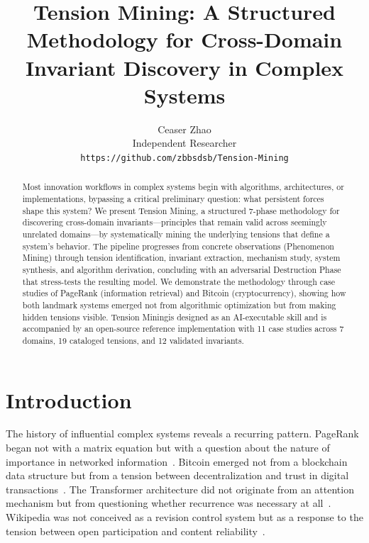 \documentclass[11pt,a4paper]{article}
\newcommand{\methodname}{Tension Mining}
\begin{document}
\title{\textbf{\methodname}: A Structured Methodology for Cross-Domain Invariant Discovery in Complex Systems}

\author{Ceaser Zhao\\[4pt]
\small Independent Researcher\\
\small \texttt{https://github.com/zbbsdsb/Tension-Mining}}

\date{}

\maketitle

\begin{abstract}
Most innovation workflows in complex systems begin with algorithms, architectures, or implementations, bypassing a critical preliminary question: what persistent forces shape this system? We present \methodname, a structured 7-phase methodology for discovering cross-domain invariants---principles that remain valid across seemingly unrelated domains---by systematically mining the underlying tensions that define a system's behavior. The pipeline progresses from concrete observations (Phenomenon Mining) through tension identification, invariant extraction, mechanism study, system synthesis, and algorithm derivation, concluding with an adversarial Destruction Phase that stress-tests the resulting model. We demonstrate the methodology through case studies of PageRank (information retrieval) and Bitcoin (cryptocurrency), showing how both landmark systems emerged not from algorithmic optimization but from making hidden tensions visible. \methodname is designed as an AI-executable skill and is accompanied by an open-source reference implementation with 11 case studies across 7 domains, 19 cataloged tensions, and 12 validated invariants.
\end{abstract}

\section{Introduction}
\label{sec:introduction}

The history of influential complex systems reveals a recurring pattern. PageRank began not with a matrix equation but with a question about the nature of importance in networked information~\cite{page1999pagerank}. Bitcoin emerged not from a blockchain data structure but from a tension between decentralization and trust in digital transactions~\cite{nakamoto2008bitcoin}. The Transformer architecture did not originate from an attention mechanism but from questioning whether recurrence was necessary at all~\cite{vaswani2017attention}. Wikipedia was not conceived as a revision control system but as a response to the tension between open participation and content reliability~\cite{vygotsky1978mind}.
\end{document}
